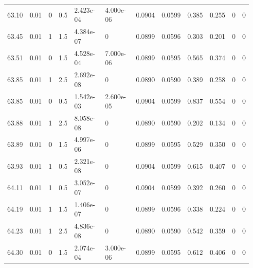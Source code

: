 \documentclass[preview]{standalone}
\begin{document}
{{{{{{{{{{{{\begin{tabular}{L{1.2cm}C{1.2cm} C{0.3cm}C{0.5cm} C{1.4cm}C{1.4cm} C{1.4cm}C{1.4cm} C{1.6cm}C{1.6cm} C{1.6cm}C{1.6cm}}
  63.10  &  0.01  & 0     & 0.5 &  2.423e-04  & 4.000e-06  &  0.0904&   0.0599& 0.385 & 0.255   &  0 & 0  \\ 
  63.45  &  0.01  & 1     & 1.5 &  4.384e-07  & 0  &  0.0899&   0.0596& 0.303 & 0.201   &  0 & 0  \\ 
  63.51  &  0.01  & 0     & 1.5 &  4.528e-04  & 7.000e-06  &  0.0899&   0.0595& 0.565 & 0.374   &  0 & 0  \\ 
  63.85  &  0.01  & 1     & 2.5 &  2.692e-08  & 0  &  0.0890&   0.0590& 0.389 & 0.258   &  0 & 0  \\ 
  63.85  &  0.01  & 0     & 0.5 &  1.542e-03  & 2.600e-05  &  0.0904&   0.0599& 0.837 & 0.554   &  0 & 0  \\ 
  63.88  &  0.01  & 1     & 2.5 &  8.058e-08  & 0  &  0.0890&   0.0590& 0.202 & 0.134   &  0 & 0  \\ 
  63.89  &  0.01  & 0     & 1.5 &  4.997e-06  & 0  &  0.0899&   0.0595& 0.529 & 0.350   &  0 & 0  \\ 
  63.93  &  0.01  & 1     & 0.5 &  2.321e-08  & 0  &  0.0904&   0.0599& 0.615 & 0.407   &  0 & 0  \\ 
  64.11  &  0.01  & 1     & 0.5 &  3.052e-07  & 0  &  0.0904&   0.0599& 0.392 & 0.260   &  0 & 0  \\ 
  64.19  &  0.01  & 1     & 1.5 &  1.406e-07  & 0  &  0.0899&   0.0596& 0.338 & 0.224   &  0 & 0  \\ 
  64.23  &  0.01  & 1     & 2.5 &  4.836e-08  & 0  &  0.0890&   0.0590& 0.542 & 0.359   &  0 & 0  \\ 
  64.30  &  0.01  & 0     & 1.5 &  2.074e-04  & 3.000e-06  &  0.0899&   0.0595& 0.612 & 0.406   &  0 & 0  \\ 
\hline 
\end{tabular} 

}}}}}}}}}}}}
\end{document}
